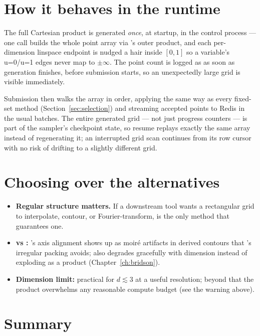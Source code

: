 \section{How it behaves in the runtime}
\label{sec:grid-runtime}

The full Cartesian product is generated \emph{once}, at startup, in the control process
--- one call builds the whole point array via 's outer product, and each
per-dimension linspace endpoint is nudged a hair inside $[0,1]$ so a 
variable's u=0/u=1 edges never map to $\pm\infty$. The point count is logged as
 as soon as generation finishes, before submission starts, so an
unexpectedly large grid is visible immediately.

Submission then walks the array in order, applying  the same way as
every fixed-set method (Section~\ref{sec:selection}) and streaming accepted points to
Redis in the usual batches. The entire generated grid --- not just progress counters ---
is part of the sampler's checkpoint state, so resume replays exactly the same array
instead of regenerating it; an interrupted grid scan continues from its row cursor with
no risk of drifting to a slightly different grid.

\section{Choosing  over the alternatives}

\begin{itemize}
  \item \textbf{Regular structure matters.} If a downstream tool wants a rectangular
        grid to interpolate, contour, or Fourier-transform,  is the only
        method that guarantees one.
  \item \textbf{vs :} 's axis alignment shows up as
        moir\'e artifacts in derived contours that 's irregular
        packing avoids;  also degrades gracefully with dimension
        instead of exploding as a product (Chapter~\ref{ch:bridson}).
  \item \textbf{Dimension limit:} practical for $d \lesssim 3$ at a useful resolution;
        beyond that the product overwhelms any reasonable compute budget
        (see the warning above).
\end{itemize}

\section{Summary}
\label{sec:grid-summary}

